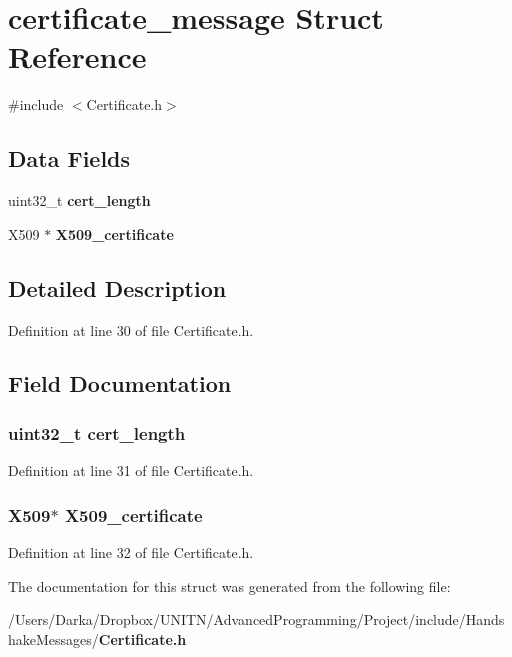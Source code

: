 \section{certificate\+\_\+message Struct Reference}
\label{structcertificate__message}


{\ttfamily \#include $<$Certificate.\+h$>$}

\subsection*{Data Fields}
\begin{DoxyCompactItemize}
\item 
uint32\+\_\+t {\bf cert\+\_\+length}
\item 
X509 $\ast$ {\bf X509\+\_\+certificate}
\end{DoxyCompactItemize}


\subsection{Detailed Description}


Definition at line 30 of file Certificate.\+h.



\subsection{Field Documentation}
\subsubsection[{cert\+\_\+length}]{\setlength{\rightskip}{0pt plus 5cm}uint32\+\_\+t cert\+\_\+length}\label{structcertificate__message_ab534aa9b18ddd479ee8603fd8a0e3e07}


Definition at line 31 of file Certificate.\+h.

\subsubsection[{X509\+\_\+certificate}]{\setlength{\rightskip}{0pt plus 5cm}X509$\ast$ X509\+\_\+certificate}\label{structcertificate__message_aa02d32568d177ce73429e6cff12fa7b2}


Definition at line 32 of file Certificate.\+h.



The documentation for this struct was generated from the following file\+:\begin{DoxyCompactItemize}
\item 
/\+Users/\+Darka/\+Dropbox/\+U\+N\+I\+T\+N/\+Advanced\+Programming/\+Project/include/\+Handshake\+Messages/{\bf Certificate.\+h}\end{DoxyCompactItemize}
